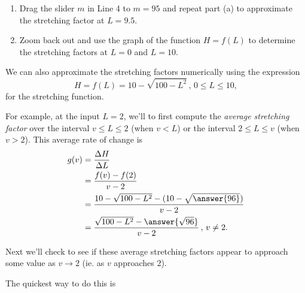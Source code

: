 \documentclass{ximera}
\begin{document}
\begin{example}
\begin{enumerate}
\item Drag the slider $m$ in Line 4 to $m=95$ and repeat part (a) to approximate the stretching factor at $L=9.5$.

\item Zoom back out and use the graph of the function $H=f(L)$ to determine the stretching factors at $L=0$ and $L=10$.
\end{enumerate}

We can also approximate the stretching factors numerically using the expression
\[
      H = f(L) = 10- \sqrt{100-L^2} \, , \, 0\leq L \leq 10,
\] 
for the stretching function.

For example, at the input $L=2$, we'll to first compute the \emph{average stretching factor} over the interval $v\leq L \leq 2$ (when $v<L$) or the interval $2 \leq L \leq v$ (when $v>2$). This average rate of change is 
\begin{align*}
 g(v) &= \frac{\Delta H}{\Delta L} \\
              &= \frac{f(v) - f(2)}{v-2} \\
              &=\frac{10 - \sqrt{100-L^2} - (10 - \sqrt{\answer{96}})}{v-2}   \\
              &= \frac{\sqrt{100-L^2} - \answer{\sqrt{96}}}{v-2} \, , \, v \neq 2.
\end{align*}

Next we'll check to see if these average stretching factors appear to approach some value as $v\to 2$ (ie. as $v$ approaches $2$).

The quickest way to do this is  
\end{example}
\end{document}
